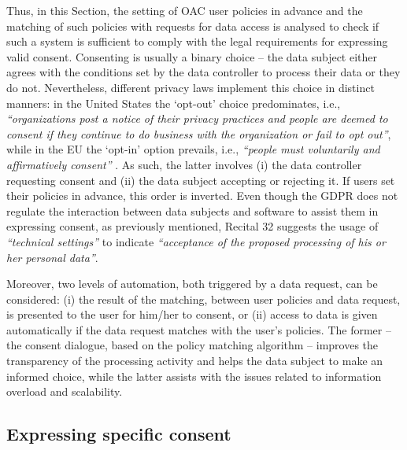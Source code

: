 Thus, in this Section, the setting of OAC user policies in advance and the matching of such policies with requests for data access is analysed to check if such a system is sufficient to comply with the legal requirements for expressing valid consent.
Consenting is usually a binary choice -- the data subject either agrees with the conditions set by the data controller to process their data or they do not.
Nevertheless, different privacy laws implement this choice in distinct manners: in the United States the `opt-out' choice predominates, i.e., \textit{``organizations post a notice of their privacy practices and people are deemed to consent if they continue to do business with the organization or fail to opt out''}, while in the EU the `opt-in' option prevails, i.e., \textit{``people must voluntarily and affirmatively consent''} \citep{solove_murky_2023}.
As such, the latter involves (i) the data controller requesting consent and (ii) the data subject accepting or rejecting it.
If users set their policies in advance, this order is inverted.
Even though the GDPR does not regulate the interaction between data subjects and software to assist them in expressing consent, as previously mentioned, Recital 32 \citeyearpar{noauthor_regulation_2016} suggests the usage of \textit{``technical settings''} to indicate \textit{``acceptance of the proposed processing of his or her personal data''}.

Moreover, two levels of automation, both triggered by a data request, can be considered: (i) the result of the matching, between user policies and data request, is presented to the user for him/her to consent, or (ii) access to data is given automatically if the data request matches with the user's policies.
The former -- the consent dialogue, based on the policy matching algorithm -- improves the transparency of the processing activity and helps the data subject to make an informed choice, while the latter assists with the issues related to information overload and scalability.

\subsection{Expressing specific consent}
\label{sec:specific_consent}

